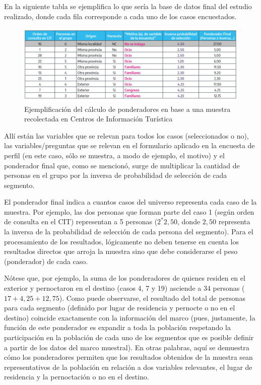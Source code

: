 \documentclass[
]{book}
\begin{document}
En la siguiente tabla se ejemplifica lo que sería la base de datos final del estudio realizado, donde cada fila corresponde a cada uno de los casos encuestados.

\begin{figure}

{\centering \includegraphics[width=1\linewidth]{imagenes/tabla_2} 

}

\caption{Ejemplificación del cálculo de ponderadores en base a una muestra recolectada en Centros de Información Turística}\label{fig:Casosencuestados}
\end{figure}

Allí están las variables que se relevan para todos los casos (seleccionados o no), las variables/preguntas que se relevan en el formulario aplicado en la encuesta de perfil (en este caso, sólo se muestra, a modo de ejemplo, el motivo) y el ponderador final que, como se mencionó, surge de multiplicar la cantidad de personas en el grupo por la inversa de probabilidad de selección de cada segmento.

El ponderador final indica a cuantos casos del universo representa cada caso de la muestra. Por ejemplo, las dos personas que forman parte del caso 1 (según orden de consulta en el CIT) representan a 5 personas (\(2^* 2,50\), donde \(2,50\) representa la inversa de la probabilidad de selección de cada persona del segmento). Para el procesamiento de los resultados, lógicamente no deben tenerse en cuenta los resultados directos que arroja la muestra sino que debe considerarse el peso (ponderador) de cada caso.

Nótese que, por ejemplo, la suma de los ponderadores de quienes residen en el exterior y pernoctaron en el destino (casos 4, 7 y 19) asciende a 34 personas (\(17+4,25+12,75\)). Como puede observarse, el resultado del total de personas para cada segmento (definido por lugar de residencia y pernocte o no en el destino) coincide exactamente con la información del marco (pues, justamente, la función de este ponderador es expandir a toda la población respetando la participación en la población de cada uno de los segmentos que es posible definir a partir de los datos del marco muestral). En otras palabras, aquí se demuestra cómo los ponderadores permiten que los resultados obtenidos de la muestra sean representativos de la población en relación a dos variables relevantes, el lugar de residencia y la pernoctación o no en el destino.
\end{document}
